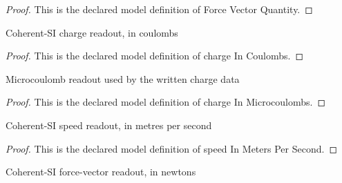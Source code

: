 \begin{proof}
  This is the declared model definition of Force Vector Quantity.
\end{proof}
\begin{definition}
  \label{def:physics:phyx-mini-0963:phyxminiproblems-problemphyxmini0963-chargeincoulombs}
  Coherent-SI charge readout, in coulombs
\end{definition}
\begin{proof}
  This is the declared model definition of charge In Coulombs.
\end{proof}
\begin{definition}
  \label{def:physics:phyx-mini-0963:phyxminiproblems-problemphyxmini0963-chargeinmicrocoulombs}
  Microcoulomb readout used by the written charge data
\end{definition}
\begin{proof}
  This is the declared model definition of charge In Microcoulombs.
\end{proof}
\begin{definition}
  \label{def:physics:phyx-mini-0963:phyxminiproblems-problemphyxmini0963-speedinmeterspersecond}
  Coherent-SI speed readout, in metres per second
\end{definition}
\begin{proof}
  This is the declared model definition of speed In Meters Per Second.
\end{proof}
\begin{definition}
  \label{def:physics:phyx-mini-0963:phyxminiproblems-problemphyxmini0963-forcevectorinnewtons}
  Coherent-SI force-vector readout, in newtons
\end{definition}
